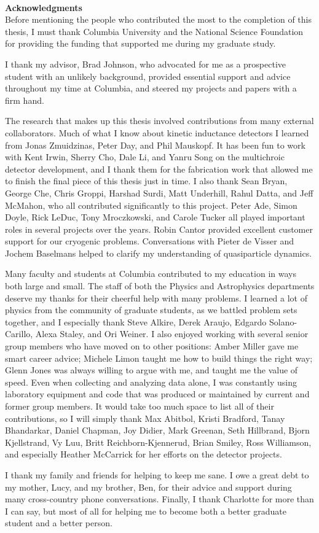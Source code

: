 ~\\[1in] %
\textbf{\Huge Acknowledgments}\\

Before mentioning the people who contributed the most to the completion of this thesis, I must thank Columbia University and the National Science Foundation for providing the funding that supported me during my graduate study.

I thank my advisor, Brad Johnson, who advocated for me as a prospective student with an unlikely background, provided essential support and advice throughout my time at Columbia, and steered my projects and papers with a firm hand.

The research that makes up this thesis involved contributions from many external collaborators.
Much of what I know about kinetic inductance detectors I learned from Jonas Zmuidzinas, Peter Day, and Phil Mauskopf. 
It has been fun to work with Kent Irwin, Sherry Cho, Dale Li, and Yanru Song on the multichroic detector development, and I thank them for the fabrication work that allowed me to finish the final piece of this thesis just in time.
I also thank Sean Bryan, George Che, Chris Groppi, Harshad Surdi, Matt Underhill, Rahul Datta, and Jeff McMahon, who all contributed significantly to this project.
Peter Ade, Simon Doyle, Rick LeDuc, Tony Mroczkowski, and Carole Tucker all played important roles in several projects over the years.
Robin Cantor provided excellent customer support for our cryogenic problems.
Conversations with Pieter de Visser and Jochem Baselmans helped to clarify my understanding of quasiparticle dynamics.

Many faculty and students at Columbia contributed to my education in ways both large and small.
The staff of both the Physics and Astrophysics departments deserve my thanks for their cheerful help with many problems.
I learned a lot of physics from the community of graduate students, as we battled problem sets together, and I especially thank Steve Alkire, Derek Araujo, Edgardo Solano-Carillo, Alexa Staley, and Ori Weiner.
I also enjoyed working with several senior group members who have moved on to other positions:
Amber Miller gave me smart career advice;
Michele Limon taught me how to build things the right way;
Glenn Jones was always willing to argue with me, and taught me the value of speed.
Even when collecting and analyzing data alone, I was constantly using laboratory equipment and code that was produced or maintained by current and former group members.
It would take too much space to list all of their contributions, so I will simply thank Max Abitbol, Kristi Bradford, Tanay Bhandarkar, Daniel Chapman, Joy Didier, Mark Greenan, Seth Hillbrand, Bjorn Kjellstrand, Vy Luu, Britt Reichborn-Kjennerud, Brian Smiley, Ross Williamson, and especially Heather McCarrick for her efforts on the detector projects.

I thank my family and friends for helping to keep me sane.
I owe a great debt to my mother, Lucy, and my brother, Ben, for their advice and support during many cross-country phone conversations.
Finally, I thank Charlotte for more than I can say, but most of all for helping me to become both a better graduate student and a better person.

